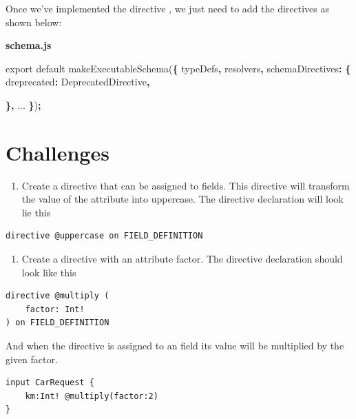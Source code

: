 \documentclass[]{book}
\newenvironment{Shaded}{\begin{snugshade}}{\end{snugshade}}
\newcommand{\DataTypeTok}[1]{\textcolor[rgb]{0.13,0.29,0.53}{#1}}
\newcommand{\ImportTok}[1]{#1}
\newcommand{\OperatorTok}[1]{\textcolor[rgb]{0.81,0.36,0.00}{\textbf{#1}}}
\newcommand{\AttributeTok}[1]{\textcolor[rgb]{0.77,0.63,0.00}{#1}}
\newcommand{\NormalTok}[1]{#1}
\providecommand{\tightlist}{%
  \setlength{\itemsep}{0pt}\setlength{\parskip}{0pt}}
\begin{document}
Once we've implemented the directive , we just need to add the
directives as shown below:

\textbf{schema.js}

\begin{Shaded}
\begin{Highlighting}[]
\ImportTok{export} \ImportTok{default} \AttributeTok{makeExecutableSchema}\NormalTok{(}\OperatorTok{\{}
\NormalTok{    typeDefs}\OperatorTok{,}
\NormalTok{    resolvers}\OperatorTok{,}
    \DataTypeTok{schemaDirectives}\OperatorTok{:} \OperatorTok{\{}
        \DataTypeTok{dreprecated}\OperatorTok{:}\NormalTok{ DeprecatedDirective}\OperatorTok{,}
        
    \OperatorTok{\},}
\NormalTok{    ...}
\OperatorTok{\}}\NormalTok{)}\OperatorTok{;}
\end{Highlighting}
\end{Shaded}

\section{Challenges}\label{challenges-4}

\begin{enumerate}
\def\labelenumi{\arabic{enumi}.}
\tightlist
\item
  Create a directive \citet{uppercase} that can be assigned to fields.
  This directive will transform the value of the attribute into
  uppercase. The directive declaration will look lie this
\end{enumerate}

\begin{verbatim}
directive @uppercase on FIELD_DEFINITION
\end{verbatim}

\begin{enumerate}
\def\labelenumi{\arabic{enumi}.}
\setcounter{enumi}{1}
\tightlist
\item
  Create a directive \citet{multiply} with an attribute factor. The
  directive declaration should look like this
\end{enumerate}

\begin{verbatim}
directive @multiply (
    factor: Int!
) on FIELD_DEFINITION
\end{verbatim}

And when the directive is assigned to an field its value will be
multiplied by the given factor.

\begin{verbatim}
input CarRequest {
    km:Int! @multiply(factor:2)
}
\end{verbatim}
\end{document}
